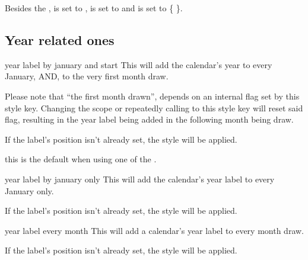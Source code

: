 \documentclass{article}
\begin{document}
\begin{tsremark}[Defaults:] Besides the ,  is set to ,  is set to  and   is set to \{ \}.
\end{tsremark}

\subsection{Year related ones}


\begin{codedescribe}[key]{year label by january and start}
This will add the calendar's year to every January, AND, to the very first month draw.
\end{codedescribe}

\begin{tsremark} Please note that ``the first month drawn'', depends on an internal flag set by this style key. Changing the scope or repeatedly calling to this style key will reset said flag, resulting in the year label being added in the following month being draw.
\end{tsremark}

\begin{tsremark} 
If the label's position isn't already set, the style  will be applied.
\end{tsremark}

\begin{tsremark} 
this is the default when using one of the .
\end{tsremark}

\begin{codedescribe}[key]{year label by january only}
This will add the calendar's year label to every January only.
\end{codedescribe}

\begin{tsremark} 
If the label's position isn't already set, the style  will be applied.
\end{tsremark}


\begin{codedescribe}[key]{year label every month}
This will add a calendar's year label to every month draw.
\end{codedescribe}

\begin{tsremark} 
If the label's position isn't already set, the style  will be applied.
\end{tsremark}
\end{document}
